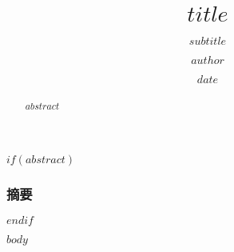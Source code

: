 \documentclass[10pt]{beamer}
\title{$title$}
\subtitle{$subtitle$}
\author{$author$}
\institute{$institute$}
\date{$date$}
\begin{document}
\frame{\titlepage}

$if(abstract)$
\begin{frame}
\frametitle{摘要}
\begin{abstract}
$abstract$
\end{abstract}
\end{frame}
$endif$

$body$
\end{document}
